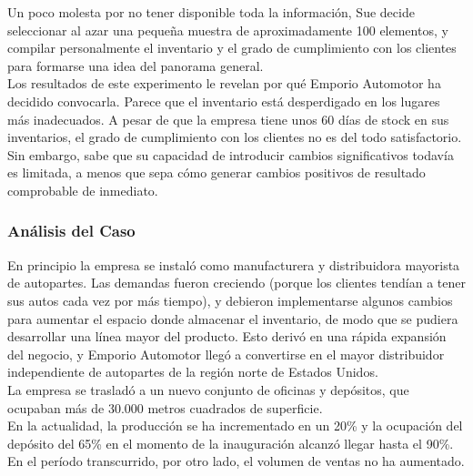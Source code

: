 \documentclass[a4paper,10pt,titlepage]{article}
\begin{document}
		\indent Un poco molesta por no tener disponible toda la informaci\'on, Sue decide seleccionar al azar una pequeña muestra de aproximadamente 100 elementos, y compilar personalmente el inventario y el grado de cumplimiento con los clientes para formarse una idea del panorama general.\\
		\indent Los resultados de este experimento le revelan por qu\'e Emporio Automotor ha decidido convocarla. Parece que el inventario est\'a desperdigado en los lugares m\'as inadecuados. A pesar de que la empresa tiene unos 60 d\'ias de stock en sus inventarios, el grado de cumplimiento con los clientes no es del todo satisfactorio. \\
		\indent Sin embargo, sabe que su capacidad de introducir cambios significativos todav\'ia es limitada, a menos que sepa c\'omo generar cambios positivos de resultado comprobable de inmediato.\\

\newpage
\subsubsection {An\'alisis del Caso}
		
		\indent En principio la empresa se instal\'o como manufacturera y distribuidora mayorista de autopartes. Las demandas fueron creciendo (porque los clientes tend\'ian a tener sus autos cada vez por m\'as tiempo), y debieron implementarse algunos cambios para aumentar el espacio donde almacenar el inventario, de modo que se pudiera desarrollar una l\'inea mayor del producto. Esto deriv\'o en una r\'apida expansi\'on del negocio, y Emporio Automotor lleg\'o a convertirse en el mayor distribuidor independiente de autopartes de la regi\'on norte de Estados Unidos.\\
		\indent La empresa se traslad\'o a un nuevo conjunto de oficinas y dep\'ositos, que ocupaban m\'as de 30.000 metros cuadrados de superficie.\\
		\indent En la actualidad, la producci\'on se ha incrementado en un 20\% y la ocupaci\'on del dep\'osito del 65\% en el momento de la inauguraci\'on alcanz\'o llegar hasta el 90\%. En el per\'iodo transcurrido, por otro lado, el volumen de ventas no ha aumentado.\\
\end{document}
